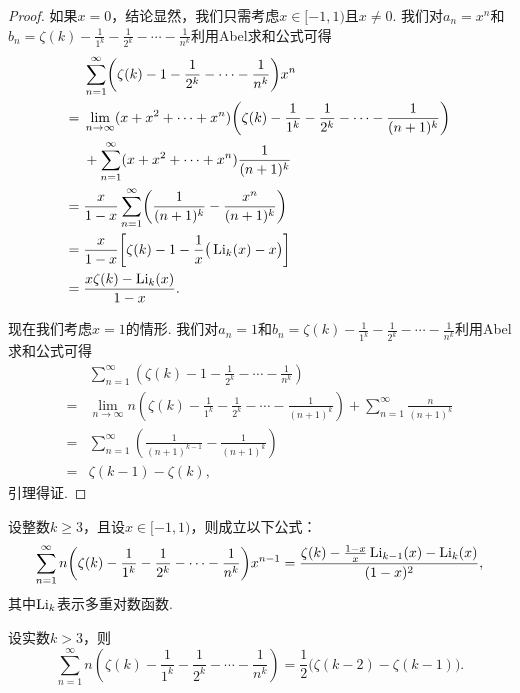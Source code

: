 \begin{proof}
  如果$x=0$，结论显然，我们只需考虑$x\in[-1,1)$且$x\ne0$. 我们对$a_n=x^n$和$b_n=\zeta(k)-\frac1{1^k}-\frac1{2^k}-\cdots
  -\frac1{n^k}$利用Abel求和公式可得
  \begin{align*}
    & \sum_{n=1}^\infty \left(\zeta(k) - 1 - \frac1{2^k} - \cdots - \frac1{n^k}\right)x^n \\
    = {}& \lim_{n\to\infty}(x + x^2 + \cdots + x^n)\left(\zeta(k) - \frac1{1^k} - \frac1{2^k} - \cdots - \frac1{(n+1)^k}\right) \\
    & + \sum_{n=1}^\infty (x + x^2 + \cdots + x^n)\frac1{(n + 1)^k} \\
    = {}& \frac x{1-x} \sum_{n=1}^\infty \left( \frac1{(n+1)^k} - \frac{x^n}{(n+1)^k} \right) \\
    = {}& \frac x{1-x} \left[ \zeta(k) - 1 - \frac1x\big( \Li_k(x) - x \big) \right] \\
    = {}& \frac{x\zeta(k) - \Li_k(x)}{1-x}.
  \end{align*}

  现在我们考虑$x=1$的情形. 我们对$a_n=1$和$b_n=\zeta(k)-\frac1{1^k}-\frac1{2^k}-\cdots
  -\frac1{n^k}$利用Abel求和公式可得
  \begin{align*}
     &\sum_{n=1}^\infty \left(\zeta(k) - 1 - \frac1{2^k} - \cdots - \frac1{n^k}\right)\\
    = {}& \lim_{n\to\infty}n \left(\zeta(k) - \frac1{1^k} - \frac1{2^k} - \cdots - \frac1{(n+1)^k}\right) + \sum_{n=1}^\infty \frac n{(n + 1)^k} \\
    = {}& \sum_{n=1}^\infty \left( \frac1{(n+1)^{k-1}} - \frac1{(n+1)^k} \right) \\
    = {}& \zeta(k-1) - \zeta(k),
  \end{align*}
  引理得证.
\end{proof}

\begin{mybox}
  \begin{lemma}
    \begin{enum}
      \item 设整数$k\ge3$，且设$x\in[-1,1)$，则成立以下公式：
       \[
         \sum_{n=1}^\infty n\left(\zeta(k) - \frac1{1^k} - \frac1{2^k} - \cdots - \frac1{n^k}\right)x^{n-1} =
         \frac{\zeta(k)-\frac{1-x}x\Li_{k-1}(x)-\Li_k(x)}{
         (1-x)^2},
       \]
      其中$\operatorname{Li}_k$表示多重对数函数.
      \item 设实数$k>3$，则
       \[
         \sum_{n=1}^\infty n\left(\zeta(k) - \frac1{1^k} - \frac1{2^k} - \cdots - \frac1{n^k}\right) = \frac12\big( \zeta(k-2) - \zeta(k-1) \big).
       \]
    \end{enum}
  \end{lemma}
\end{mybox}

